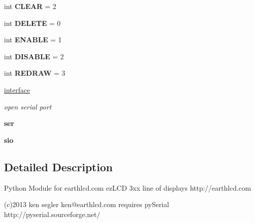 \begin{DoxyCompactItemize}
\item 
\hypertarget{namespaceez_l_c_d3xx_aaabbbb4a0f7dde06f73c821cbb8c2da9}{int {\bfseries C\-L\-E\-A\-R} = 2}\label{df/d76/namespaceez_l_c_d3xx_aaabbbb4a0f7dde06f73c821cbb8c2da9}

\item 
\hypertarget{namespaceez_l_c_d3xx_a981026b3a604210e561134ac7b39efbf}{int {\bfseries D\-E\-L\-E\-T\-E} = 0}\label{df/d76/namespaceez_l_c_d3xx_a981026b3a604210e561134ac7b39efbf}

\item 
\hypertarget{namespaceez_l_c_d3xx_a07b49992c17d8940af6ef3a44070eed6}{int {\bfseries E\-N\-A\-B\-L\-E} = 1}\label{df/d76/namespaceez_l_c_d3xx_a07b49992c17d8940af6ef3a44070eed6}

\item 
\hypertarget{namespaceez_l_c_d3xx_a0cbf9954056c2191d30aea1a787159d6}{int {\bfseries D\-I\-S\-A\-B\-L\-E} = 2}\label{df/d76/namespaceez_l_c_d3xx_a0cbf9954056c2191d30aea1a787159d6}

\item 
\hypertarget{namespaceez_l_c_d3xx_a9e1593670c7a175be778fbb563e50b23}{int {\bfseries R\-E\-D\-R\-A\-W} = 3}\label{df/d76/namespaceez_l_c_d3xx_a9e1593670c7a175be778fbb563e50b23}

\item 
\hypertarget{namespaceez_l_c_d3xx_afcf658508c426a01de8e18e7fb3530ca}{\hyperlink{namespaceez_l_c_d3xx_afcf658508c426a01de8e18e7fb3530ca}{interface}}\label{df/d76/namespaceez_l_c_d3xx_afcf658508c426a01de8e18e7fb3530ca}

\begin{DoxyCompactList}\small\item\em open serial port \end{DoxyCompactList}\item 
\hypertarget{namespaceez_l_c_d3xx_a11773e4014d1da38ff2a8a46723c5b97}{{\bfseries ser}}\label{df/d76/namespaceez_l_c_d3xx_a11773e4014d1da38ff2a8a46723c5b97}

\item 
\hypertarget{namespaceez_l_c_d3xx_a945b8f81819428da2c0a1aada626e598}{{\bfseries sio}}\label{df/d76/namespaceez_l_c_d3xx_a945b8f81819428da2c0a1aada626e598}

\end{DoxyCompactItemize}


\subsection{Detailed Description}
\begin{DoxyVerb}Python Module for earthlcd.com ezLCD 3xx line of displays
http://earthlcd.com

(c)2013 ken segler
ken@earthlcd.com 
requires pySerial http://pyserial.sourceforge.net/
\end{DoxyVerb}
 

